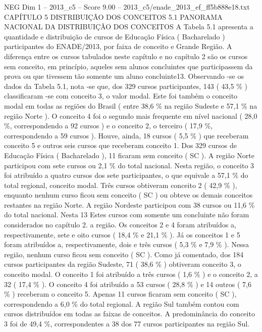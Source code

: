 \begin{textsample}{NEG Dim 1 – 2013\_c5 – Score 9.00 – 2013\_c5/enade\_2013\_ef\_ff5b888e18.txt}  \label{ex:f1_neg_359}
CAPÍTULO 5 DISTRIBUIÇÃO DOS CONCEITOS 5.1 PANORAMA NACIONAL DA DISTRIBUIÇÃO DOS CONCEITOS A Tabela 5.1 apresenta a quantidade e distribuição de cursos de Educação Física ( Bacharelado ) participantes do ENADE/2013, por faixa de conceito e Grande Região.
A diferença entre os cursos tabulados neste capítulo e no capítulo 2 são os cursos sem conceito, em princípio, aqueles sem alunos concluintes que participassem da prova ou que tivessem tão somente um aluno concluinte13.
Observando -se os dados da Tabela 5.1, nota -se que, dos 329 cursos participantes, 143 ( 43,5 \% ) classificaram -se com conceito 3, o valor modal.
Este foi também o conceito modal em todas as regiões do Brasil ( entre 38,6 \% na região Sudeste e 57,1 \% na região Norte ).
O conceito 4 foi o segundo mais frequente em nível nacional ( 28,0 \%, correspondendo a 92 cursos ) e o conceito 2, o terceiro ( 17,9 \%, correspondendo a 59 cursos ).
Houve, ainda, 18 cursos ( 5,5 \% ) que receberam conceito 5 e outros seis cursos que receberam conceito 1.
Dos 329 cursos de Educação Física ( Bacharelado ), 11 ficaram sem conceito ( SC ).
A região Norte participou com sete cursos ou 2,1 \% do total nacional.
Nesta região, o conceito 3 foi atribuído a quatro cursos dos sete participantes, o que equivale a 57,1 \% do total regional, conceito modal.
Três cursos obtiveram conceito 2 ( 42,9 \% ), enquanto nenhum curso ficou sem conceito ( SC ) ou obteve os demais conceitos restantes na região Norte.
A região Nordeste participou com 38 cursos ou 11,6 \% do total nacional.
Nesta 13 Estes cursos com somente um concluinte não foram considerados no capítulo 2. a região.
Os conceitos 2 e 4 foram atribuídos a, respectivamente, sete e oito cursos ( 18,4 \% e 21,1 \% ).
Já os conceitos 1 e 5 foram atribuídos a, respectivamente, dois e três cursos ( 5,3 \% e 7,9 \% ).
Nessa região, nenhum curso ficou sem conceito ( SC ).
Como já comentado, dos 184 cursos participantes da região Sudeste, 71 ( 38,6 \% ) obtiveram conceito 3, o conceito modal.
O conceito 1 foi atribuído a três cursos ( 1,6 \% ) e o conceito 2, a 32 ( 17,4 \% ).
O conceito 4 foi atribuído a 53 cursos ( 28,8 \% ) e 14 outros ( 7,6 \% ) receberam o conceito 5.
Apenas 11 cursos ficaram sem conceito ( SC ), correspondendo a 6,0 \% do total regional.
A região Sul também contou com cursos distribuídos em todas as faixas de conceitos.
A predominância do conceito 3 foi de 49,4 \%, correspondentes a 38 dos 77 cursos participantes na região Sul.

\end{textsample}
